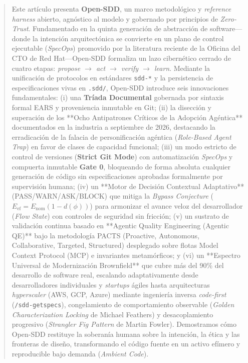 \documentclass[11pt,a4paper]{article}
\begin{document}
\begin{abstract}
Este artículo presenta \textbf{Open-SDD}, un marco metodológico y \textit{reference harness} abierto, agnóstico al modelo y gobernado por principios de \textit{Zero-Trust}. Fundamentado en la quinta generación de abstracción de software---donde la intención arquitectónica se convierte en un plano de control ejecutable (\textit{SpecOps}) promovido por la literatura reciente de la Oficina del CTO de Red Hat---Open-SDD formaliza un lazo cibernético cerrado de cuatro etapas: \textit{propose $\rightarrow$ act $\rightarrow$ verify $\rightarrow$ learn}. Mediante la unificación de protocolos en estándares \texttt{sdd-*} y la persistencia de especificaciones vivas en \texttt{.sdd/}, Open-SDD introduce seis innovaciones fundamentales: 
(i) una \textbf{Tríada Documental} gobernada por sintaxis formal EARS y proveniencia inmutable en Git; 
(ii) la disección y superación de los **Ocho Antipatrones Críticos de la Adopción Agéntica** documentados en la industria a septiembre de 2026, destacando la erradicación de la falacia de personificación agéntica (\textit{Role-Based Agent Trap}) en favor de clases de capacidad funcional; 
(iii) un modo estricto de control de versiones (\textbf{Strict Git Mode}) con automatización \textit{SpecOps} y compuerta inmutable \textbf{Gate 0}, bloqueando de forma absoluta cualquier generación de código sin especificaciones aprobadas formalmente por supervisión humana; 
(iv) un **Motor de Decisión Contextual Adaptativo** (PASS/WARN/ASK/BLOCK) que mitiga la \textit{Bypass Conjecture} ($E_{\text{ef}} = E_{\text{nom}}(1 - d(\phi))$) para armonizar el avance veloz del desarrollador (\textit{Flow State}) con controles de seguridad sin fricción; 
(v) un sustrato de validación continua basado en **Agentic Quality Engineering (Agentic QE)** bajo la metodología PACTS (Proactive, Autonomous, Collaborative, Targeted, Structured) desplegado sobre flotas Model Context Protocol (MCP) e invariantes metamórficos; y 
(vi) un **Espectro Universal de Modernización Brownfield** que cubre más del 90\% del desarrollo de software real, escalando adaptativamente desde desarrolladores individuales y \textit{startups} ágiles hasta arquitecturas \textit{hyperscaler} (AWS, GCP, Azure) mediante ingeniería inversa \textit{code-first} (\texttt{/sdd-getspecs}), congelamiento de comportamiento observable (\textit{Golden Characterization Locking} de Michael Feathers) y desacoplamiento progresivo (\textit{Strangler Fig Pattern} de Martin Fowler). Demostramos cómo Open-SDD restituye la soberanía humana sobre la intención, la ética y las fronteras de diseño, transformando el código fuente en un activo efímero y reproducible bajo demanda (\textit{Ambient Code}).
\end{abstract}
\end{document}

